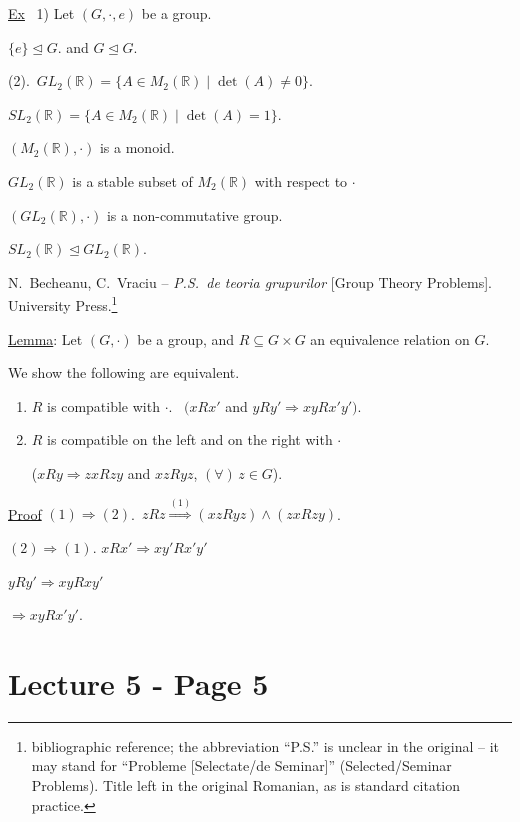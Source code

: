 \bigskip
\noindent\underline{Ex} \ 1) Let $(G,\cdot,e)$ be a group.

\noindent $\{e\}\trianglelefteq G$. \quad and \quad $G\trianglelefteq G$.

\bigskip
\noindent (2).\ $GL_2(\mathbb{R}) = \{A\in M_2(\mathbb{R}) \mid \det(A)\neq 0\}$.

\noindent $SL_2(\mathbb{R}) = \{A\in M_2(\mathbb{R}) \mid \det(A)=1\}$.

\noindent $(M_2(\mathbb{R}),\cdot)$ is a monoid.

\noindent $GL_2(\mathbb{R})$ is a stable subset of $M_2(\mathbb{R})$ with respect to $\cdot$

\noindent $(GL_2(\mathbb{R}),\cdot)$ is a non-commutative group.

\noindent $SL_2(\mathbb{R}) \trianglelefteq GL_2(\mathbb{R})$.

\bigskip
\noindent N.\ Becheanu, C.\ Vraciu -- \emph{P.S.\ de teoria grupurilor} [Group Theory Problems]. University Press.\footnote{bibliographic reference; the abbreviation ``P.S.'' is unclear in the original -- it may stand for ``Probleme [Selectate/de Seminar]'' (Selected/Seminar Problems). Title left in the original Romanian, as is standard citation practice.}

\bigskip
\noindent\underline{Lemma}: Let $(G,\cdot)$ be a group, and $R\subseteq G\times G$ an equivalence relation on $G$.

\noindent We show the following are equivalent.

\begin{enumerate}
\item[(1)] $R$ is compatible with $\cdot$. \ $\big(xRx'$ and $yRy' \Rightarrow xyRx'y'\big)$.
\item[(2)] $R$ is compatible on the left and on the right with $\cdot$

\noindent \big($xRy \Rightarrow zxRzy$ and $xzRyz$, $(\forall)\,z\in G$\big).
\end{enumerate}

\bigskip
\noindent\underline{Proof} $(1)\Rightarrow(2)$.\ $zRz \overset{(1)}{\Longrightarrow} (xzRyz)\wedge(zxRzy)$.

\bigskip
\noindent $(2) \Rightarrow (1)$. \quad $xRx' \Rightarrow xy'Rx'y'$

\noindent $yRy' \Rightarrow xyRxy'$

\noindent $\Rightarrow xyRx'y'$.



\section*{Lecture 5 - Page 5}

